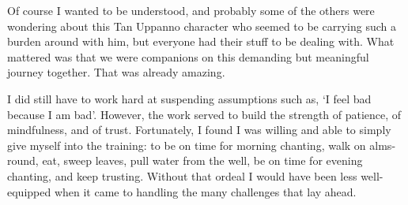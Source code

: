 Of course I wanted to be understood, and probably some of the
others were wondering about this Tan Uppanno \mbox{character} who seemed to be
carrying such a burden around with him, but everyone had their stuff to
be dealing with. What mattered was that we were companions on this
demanding but meaningful journey together. That was already amazing.

I did still have to work hard at suspending assumptions such as, `I feel
bad because I am bad'. However, the work served to build the strength of
patience, of mindfulness, and of trust. Fortunately, I found I was
willing and able to simply give myself into the training: to be on time
for morning chanting, walk on alms-round, eat, sweep leaves, pull water
from the well, be on time for evening chanting, and keep trusting.
Without that ordeal I would have been less well-equipped when it came to
handling the many challenges that lay ahead.

